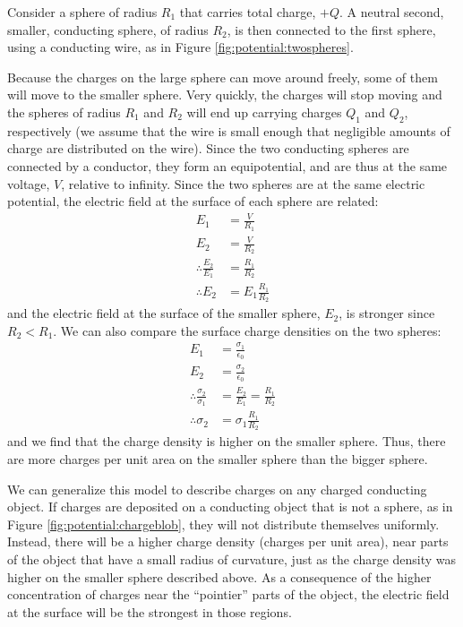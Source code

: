 Consider a sphere of radius $R_1$ that carries total charge, $+Q$. A neutral second, smaller, conducting sphere, of radius $R_2$, is then connected to the first sphere, using a conducting wire, as in Figure \ref{fig:potential:twospheres}.

Because the charges on the large sphere can move around freely, some of them will move to the smaller sphere. Very quickly, the charges will stop moving and the spheres of radius $R_1$ and $R_2$ will end up carrying charges $Q_1$ and $Q_2$, respectively (we assume that the wire is small enough that negligible amounts of charge are distributed on the wire). Since the two conducting spheres are connected by a conductor, they form an equipotential, and are thus at the same voltage, $V$, relative to infinity. Since the two spheres are at the same electric potential, the electric field at the surface of each sphere are related:
\begin{align*}
E_1&=\frac{V}{R_1}\\
E_2&=\frac{V}{R_2}\\
\therefore \frac{E_2}{E_1}&=\frac{R_1}{R_2}\\
\therefore E_2&=E_1\frac{R_1}{R_2}
\end{align*}
and the electric field at the surface of the smaller sphere, $E_2$, is stronger since $R_2<R_1$. We can also compare the surface charge densities on the two spheres:
\begin{align*}
E_1&=\frac{\sigma_1}{\epsilon_0}\\
E_2&=\frac{\sigma_2}{\epsilon_0}\\
\therefore \frac{\sigma_2}{\sigma_1}&=\frac{E_2}{E_1}=\frac{R_1}{R_2}\\
\therefore \sigma_2&=\sigma_1 \frac{R_1}{R_2}
\end{align*}
and we find that the charge density is higher on the smaller sphere. Thus, there are more charges per unit area on the smaller sphere than the bigger sphere.

We can generalize this model to describe charges on any charged conducting object. If charges are deposited on a conducting object that is not a sphere, as in Figure \ref{fig:potential:chargeblob}, they will not distribute themselves uniformly. Instead, there will be a higher charge density (charges per unit area), near parts of the object that have a small radius of curvature, just as the charge density was higher on the smaller sphere described above. As a consequence of the higher concentration of charges near the ``pointier'' parts of the object, the electric field at the surface will be the strongest in those regions.

